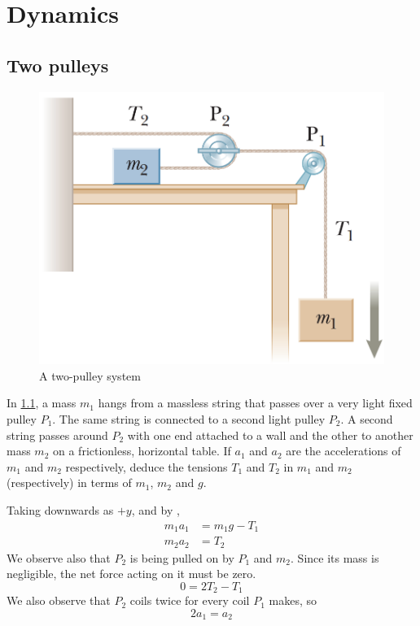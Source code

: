 \chapter{Dynamics}

\section{Two pulleys}
\begin{figure}
  \includegraphics[scale=.33]{assets/twopulleys.png}
  \caption{A two-pulley system}
  \label{fig:twopulleys}
\end{figure}

\begin{problem}
  In \cref{fig:twopulleys}, a mass \(m_1\) hangs from a massless string
  that passes over a very light fixed pulley \(P_1\).
  The same string is connected to a second light pulley \(P_2\). A
  second string passes around \(P_2\) with one end
  attached to a wall and the other to another mass \(m_2\) on a
  frictionless, horizontal table.
  If \(a_1\) and \(a_2\) are the accelerations of \(m_1\) and
  \(m_2\) respectively, deduce the tensions \(T_1\) and \(T_2\) in \(m_1\) and
  \(m_2\) (respectively) in terms of \(m_1\), \(m_2\) and \(g\).
\end{problem}

Taking downwards as \(+y\), and by ,
\begin{align}
  \label{eq:m1a1}
  m_1a_1 &= m_1g-T_1 \\
  m_2a_2 &= T_2
  \label{eq:m2a2}
\end{align}
We observe also that \(P_2\) is being pulled on by \(P_1\) and
\(m_2\). Since its
mass is negligible, the net force acting on it must be zero.
\begin{equation}
  0 = 2T_2 - T_1
  \label{eq:t1t2}
\end{equation}
We also observe that \(P_2\) coils twice for every coil \(P_1\) makes, so
\begin{equation}
  2a_1 = a_2
  \label{eq:a1a2}
\end{equation}

